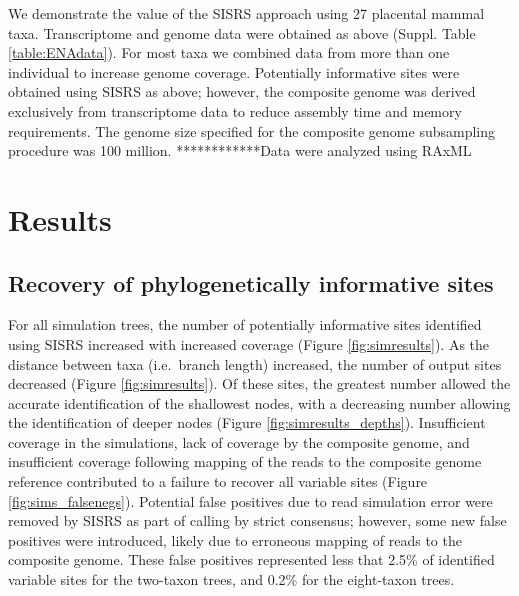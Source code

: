 \documentclass[11pt, oneside]{article}   	%
\begin{document}
We demonstrate the value of the SISRS approach using 27 placental mammal taxa.
Transcriptome and genome data were obtained as above (Suppl. Table \ref{table:ENAdata}).
For most taxa we combined data from more than one individual to increase genome coverage.
Potentially informative sites were obtained using SISRS as above; however, the composite genome was derived exclusively from transcriptome data to reduce assembly time and memory requirements.
The genome size specified for the composite genome subsampling procedure was 100 million.
************Data were analyzed using RAxML%

\section{Results\label{sec:Results}}

\subsection{Recovery of phylogenetically informative sites}

For all simulation trees, the number of potentially informative sites identified using SISRS increased with increased coverage (Figure \ref{fig:simresults}). 
As the distance between taxa (i.e.\ branch length) increased, the number of output sites decreased (Figure \ref{fig:simresults}). 
Of these sites, the greatest number allowed the accurate identification of the shallowest nodes, with a decreasing number allowing the identification of deeper nodes (Figure \ref{fig:simresults_depths}). 
Insufficient coverage in the simulations, lack of coverage by the composite genome, and insufficient coverage following mapping of the reads to the composite genome reference contributed to a failure to recover all variable sites (Figure \ref{fig:sims_falsenegs}). 
Potential false positives due to read simulation error were removed by SISRS as part of calling by strict consensus; however, some new false positives were introduced, likely due to erroneous mapping of reads to the composite genome.
These false positives represented less that 2.5\% of identified variable sites for the two-taxon trees, and 0.2\% for the eight-taxon trees.
\end{document}
